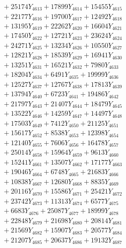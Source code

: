 \documentclass[a4paper,10pt]{article}
\begin{document}
{\begin{align}
&\;  + 25174 Y_{4613} + 17899 Y_{4614} + 15455 Y_{4615} \\[0.3ex]
&\;  + 22177 Y_{4616} + 19700 Y_{4617} + 12492 Y_{4618} \\[0.5ex]\allowbreak
&\;  + 13195 Y_{4619} + 22262 Y_{4620} + 16604 Y_{4621} \\[0.3ex]
&\;  + 17450 Y_{4622} + 12721 Y_{4623} + 23624 Y_{4624} \\[0.3ex]
&\;  + 24271 Y_{4625} + 13234 Y_{4626} + 10550 Y_{4627} \\[0.3ex]
&\;  + 12821 Y_{4628} + 18539 Y_{4629} + 16941 Y_{4630} \\[0.3ex]
&\;  + 13251 Y_{4631} + 16521 Y_{4632} + 7980 Y_{4633} \\[0.3ex]
&\;  + 18204 Y_{4634} + 6491 Y_{4635} + 19999 Y_{4636} \\[0.3ex]
&\;  + 12527 Y_{4637} + 12767 Y_{4638} + 17813 Y_{4639} \\[0.3ex]
&\;  + 13794 Y_{4640} + 6723 Y_{4641} + 19486 Y_{4642} \\[0.3ex]
&\;  + 21797 Y_{4643} + 21407 Y_{4644} + 18479 Y_{4645} \\[0.3ex]
&\;  + 13522 Y_{4646} + 14259 Y_{4647} + 14497 Y_{4648} \\[0.5ex]\allowbreak
&\;  + 17503 Y_{4649} + 7412 Y_{4650} + 21125 Y_{4651} \\[0.3ex]
&\;  + 15617 Y_{4652} + 8538 Y_{4653} + 12398 Y_{4654} \\[0.3ex]
&\;  + 12140 Y_{4655} + 7606 Y_{4656} + 16478 Y_{4657} \\[0.3ex]
&\;  + 25014 Y_{4658} + 15964 Y_{4659} + 9613 Y_{4660} \\[0.3ex]
&\;  + 15241 Y_{4661} + 13507 Y_{4662} + 17177 Y_{4663} \\[0.3ex]
&\;  + 19046 Y_{4664} + 6748 Y_{4665} + 21683 Y_{4666} \\[0.3ex]
&\;  + 10838 Y_{4667} + 12680 Y_{4668} + 8835 Y_{4669} \\[0.3ex]
&\;  + 20116 Y_{4670} + 15586 Y_{4671} + 25421 Y_{4672} \\[0.3ex]
&\;  + 23742 Y_{4673} + 11313 Y_{4674} + 6577 Y_{4675} \\[0.3ex]
&\;  + 6683 Y_{4676} + 25087 Y_{4677} + 18999 Y_{4678} \\[0.5ex]\allowbreak
&\;  + 22848 Y_{4679} + 21698 Y_{4680} + 20814 Y_{4681} \\[0.3ex]
&\;  + 21569 Y_{4682} + 15907 Y_{4683} + 20577 Y_{4684} \\[0.3ex]
&\;  + 21207 Y_{4685} + 20637 Y_{4686} + 19132 Y_{4687} \\[0.3ex]

\end{align}}
\end{document}
